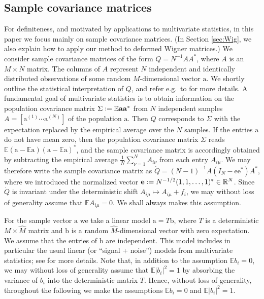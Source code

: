 \documentclass[11pt]{article} %
\numberwithin{equation}{section}
\numberwithin{figure}{section}
\theoremstyle{plain} %
\theoremstyle{definition} %
\newcommand{\f}[1]{\boldsymbol{\mathrm{#1}}} %
\newcommand{\wh}{\widehat}
\newcommand{\E}{\mathbb{E}}
\newcommand{\R}{\mathbb{R}}
\newcommand*{\deq}{\mathrel{\vcenter{\baselineskip0.65ex \lineskiplimit0pt \hbox{.}\hbox{.}}}=}
\newcommand{\abs}[1]{\lvert #1 \rvert}
\begin{document}
\subsection{Sample covariance matrices}
For definiteness, and motivated by applications to multivariate statistics, in this paper we focus mainly on sample covariance matrices. (In Section \ref{sec:Wig}, we also explain how to apply our method to deformed Wigner matrices.) We consider sample covariance matrices of the form $Q = N^{-1} A A^*$, where $A$ is an $M \times N$ matrix. The columns of $A$ represent $N$ independent and identically distributed observations of some random $M$-dimensional vector $\f a$. We shortly outline the statistical interpretation of $Q$, and refer e.g.\ to \cite{KYY} for more details. A fundamental goal of multivariate statistics is to obtain information on the population covariance matrix $\Sigma \deq \E \f a \f a^*$ from $N$ independent samples $A = [\f a^{(1)} \cdots \f a^{(N)}]$ of the population $\f a$. Then $Q$ corresponds to $\Sigma$ with the expectation replaced by the empirical average over the $N$ samples. If the entries $\f a$ do not have mean zero, then the population covariance matrix $\Sigma$ reads $\E (\f a - \E \f a)(\f a - \E \f a)^*$, and the sample covariance matrix is accordingly obtained by subtracting the empirical average $\frac{1}{N} \sum_{\nu = 1}^N A_{i \nu}$ from each entry $A_{i \mu}$. We may therefore write the sample covariance matrix as $\dot Q = (N-1)^{-1} A (I_N - \f e \f e^*) A^*$, where we introduced the normalized vector $\f e \deq N^{-1/2}(1,1, \dots, 1)^* \in \R^N$. Since $\dot Q$ is invariant under the deterministic shift $A_{i \mu} \mapsto A_{i \mu} + f_i$, we may without loss of generality assume that $\E A_{i \mu} = 0$. We shall always makes this assumption.

For the sample vector $\f a$ we take a linear model $\f a = T \f b$, where $T$ is a deterministic $M \times \wh M$ matrix and $\f b$ is a random $\wh M$-dimensional vector with zero expectation. We assume that the entries of $\f b$ are independent. This model includes in particular the usual linear (or ``signal + noise'') models from multivariate statistics; see \cite[Section 1.2]{BEKYY} for more details. Note that, in addition to the assumption $\E b_i = 0$, we may without loss of generality assume that $\E \abs{b_i}^2 = 1$ by absorbing the variance of $b_i$ into the deterministic matrix $T$. Hence, without loss of generality, throughout the following we make the assumptions $\E b_i = 0$ and $\E \abs{b_i}^2 = 1$.
\end{document}
